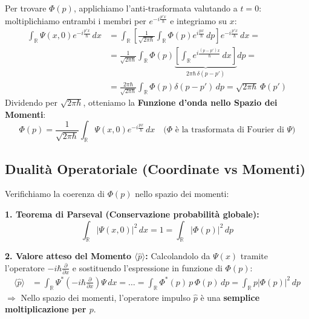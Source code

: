 \documentclass[11pt, a4paper]{article}
\begin{document}
\noindent
Per trovare $\Phi(p)$, applichiamo l'anti-trasformata valutando a $t=0$: moltiplichiamo entrambi i membri per $e^{-i\frac{p'x}{\hbar}}$ e integriamo su $x$: %
\begin{align*}
    \int_{\mathbb{R}} \Psi(x,0) e^{-i\frac{p'x}{\hbar}} \, dx &= \int_{\mathbb{R}} \left[ \frac{1}{\sqrt{2\pi\hbar}} \int_{\mathbb{R}} \Phi(p) e^{i\frac{px}{\hbar}} \, dp \right] e^{-i\frac{p'x}{\hbar}} \, dx = \\ %
    &= \frac{1}{\sqrt{2\pi\hbar}} \int_{\mathbb{R}} \Phi(p) \underbrace{ \left[ \int_{\mathbb{R}} e^{i\frac{(p-p')x}{\hbar}} \, dx \right] }_{2\pi\hbar \, \delta(p-p')} dp = \\ %
    &= \frac{2\pi\hbar}{\sqrt{2\pi\hbar}} \int_{\mathbb{R}} \Phi(p) \delta(p-p') \, dp = \sqrt{2\pi\hbar} \, \Phi(p') %
\end{align*}
Dividendo per $\sqrt{2\pi\hbar}$, otteniamo la \textbf{Funzione d'onda nello Spazio dei Momenti}: %
\begin{equation}
    \boxed{ \Phi(p) = \frac{1}{\sqrt{2\pi\hbar}} \int_{\mathbb{R}} \Psi(x,0) e^{-i\frac{px}{\hbar}} \, dx } \quad \text{($\Phi$ è la trasformata di Fourier di $\Psi$)} %
\end{equation}

\subsection{Dualità Operatoriale (Coordinate vs Momenti)} %

Verifichiamo la coerenza di $\Phi(p)$ nello spazio dei momenti: %

\noindent
\textbf{1. Teorema di Parseval (Conservazione probabilità globale):} %
\begin{equation*}
    \int_{\mathbb{R}} |\Psi(x,0)|^2 \, dx = 1 = \int_{\mathbb{R}} |\Phi(p)|^2 \, dp %
\end{equation*}

\noindent
\textbf{2. Valore atteso del Momento $\langle \hat{p} \rangle$:} %
Calcolandolo da $\Psi(x)$ tramite l'operatore $-i\hbar\frac{\partial}{\partial x}$ e sostituendo l'espressione in funzione di $\Phi(p)$: %
\begin{align*}
    \langle \hat{p} \rangle &= \int_{\mathbb{R}} \Psi^* \left( -i\hbar \frac{\partial}{\partial x} \right) \Psi \, dx = \dots = \int_{\mathbb{R}} \Phi^*(p) \, p \, \Phi(p) \, dp = \int_{\mathbb{R}} p |\Phi(p)|^2 \, dp %
\end{align*}
$\Rightarrow$ Nello spazio dei momenti, l'operatore impulso $\hat{p}$ è una \textbf{semplice moltiplicazione per $p$}. %
\end{document}
